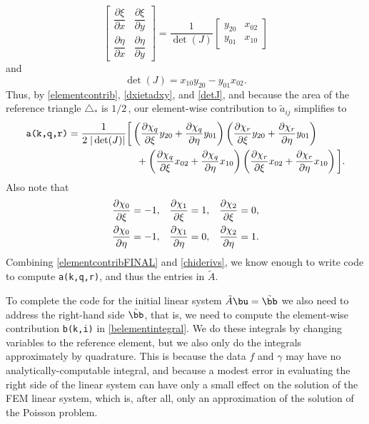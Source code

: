 \begin{equation}
\begin{bmatrix}
    \dfrac{\partial \xi}{\partial x} & \dfrac{\partial \xi}{\partial y} \\[1.0em]
    \dfrac{\partial \eta}{\partial x} & \dfrac{\partial \eta}{\partial y}
\end{bmatrix}
= \frac{1}{\det(J)}
\begin{bmatrix}
    y_{20} & x_{02} \\
    y_{01} & x_{10}
\end{bmatrix} \label{dxietadxy}
\end{equation}
and
\begin{equation}
\det(J) = x_{10} y_{20} - y_{01} x_{02}. \label{detJ}
\end{equation}
Thus, by \eqref{elementcontrib}, \eqref{dxietadxy}, and \eqref{detJ}, and because the area of the reference triangle $\triangle_\ast$ is $1/2$\,, our element-wise contribution to $\tilde a_{ij}$ simplifies to
\begin{align}
\text{\texttt{a(k,q,r)}} = \frac{1}{2\; |\det(J)|} &\bigg[\left(\frac{\partial \chi_q}{\partial \xi} y_{20} + \frac{\partial \chi_q}{\partial \eta} y_{01}\right) \left(\frac{\partial \chi_r}{\partial \xi} y_{20} + \frac{\partial \chi_r}{\partial \eta} y_{01}\right) \label{elementcontribFINAL} \\
&\quad + \left(\frac{\partial \chi_q}{\partial \xi} x_{02} + \frac{\partial \chi_q}{\partial \eta} x_{10}\right) \left(\frac{\partial \chi_r}{\partial \xi} x_{02} + \frac{\partial \chi_r}{\partial \eta} x_{10}\right)\bigg]. \notag
\end{align}
Also note that
\begin{align}
\frac{\partial \chi_0}{\partial \xi} &= -1, & \frac{\partial \chi_1}{\partial \xi} &= 1, & \frac{\partial \chi_2}{\partial \xi} &= 0, \label{chiderivs} \\
\frac{\partial \chi_0}{\partial \eta} &= -1, & \frac{\partial \chi_1}{\partial \eta} &= 0, & \frac{\partial \chi_2}{\partial \eta} &= 1. \notag
\end{align}
Combining \eqref{elementcontribFINAL} and \eqref{chiderivs}, we know enough to write code to compute \texttt{a(k,q,r)}, and thus the entries in $\tilde A$.

To complete the code for the initial linear system $\tilde A \bu = \tilde\bb$ we also need to address the right-hand side $\tilde\bb$, that is, we need to compute the element-wise contribution \texttt{b(k,i)} in \eqref{belementintegral}.  We do these integrals by changing variables to the reference element, but we also only do the integrals approximately by quadrature.  This is because the data $f$ and $\gamma$ may have no analytically-computable integral, and because a modest error in evaluating the right side of the linear system can have only a small effect on the solution of the FEM linear system, which is, after all, only an approximation of the solution of the Poisson problem.


